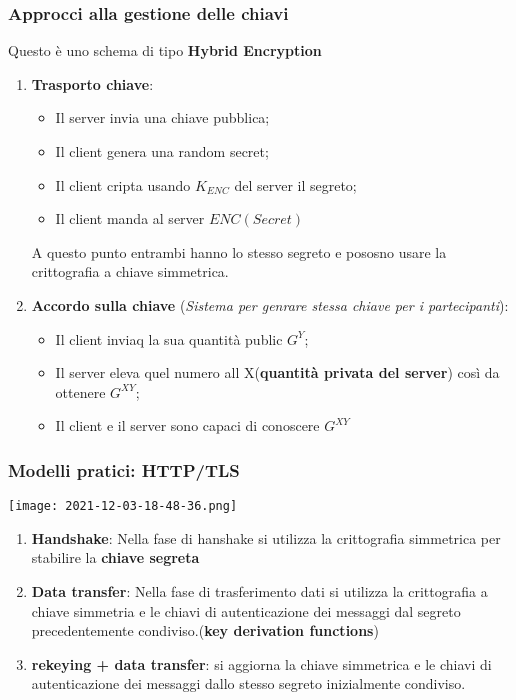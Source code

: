 \documentclass{article}
\theoremstyle{remark}
\begin{document}
\subsubsection{Approcci alla gestione delle chiavi}
Questo è uno schema di tipo \textbf{Hybrid Encryption}
\begin{enumerate}
	\item \textbf{Trasporto chiave}:\begin{itemize}
		      \item Il server invia una chiave pubblica;
		      \item Il client genera una random secret;
		      \item Il client cripta usando \(K_{ENC}\) del server il segreto;
		      \item Il client manda al server \(ENC(Secret)\)
	      \end{itemize}
	      A questo punto entrambi hanno lo stesso segreto e pososno usare la crittografia a chiave simmetrica.
	\item \textbf{Accordo sulla chiave} (\emph{Sistema per genrare stessa chiave per i partecipanti}):\begin{itemize}
		      \item Il client inviaq la sua quantità public \(G^Y\);
		      \item Il server eleva quel numero all X(\textbf{quantità privata del server}) così da ottenere \(G^{XY}\);
		      \item Il client e il server sono capaci di conoscere \(G^{XY}\)
	      \end{itemize}
\end{enumerate}
\subsubsection{Modelli pratici: HTTP/TLS}
\begin{center}
    \texttt{[image: 2021-12-03-18-48-36.png]}
\end{center}
\begin{enumerate}
    \item \textbf{Handshake}: Nella fase di hanshake si utilizza la crittografia simmetrica per stabilire la \textbf{chiave segreta}
    \item \textbf{Data transfer}: Nella fase di trasferimento dati si utilizza la crittografia a chiave simmetria e le chiavi di autenticazione dei messaggi dal segreto precedentemente condiviso.(\textbf{key derivation functions})
    \item \textbf{rekeying + data transfer}: si aggiorna la chiave simmetrica e le chiavi di autenticazione dei messaggi dallo stesso segreto inizialmente condiviso.
\end{enumerate}
\end{document}
